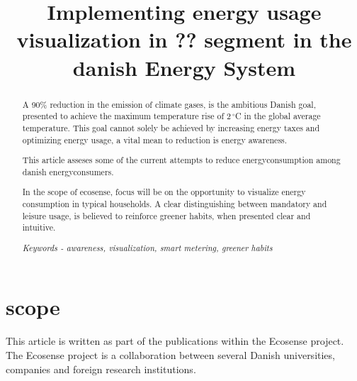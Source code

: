 \documentclass[journal]{IEEEtran}
\begin{document}
%
\title{Implementing energy usage visualization in ?? segment in the danish Energy System}


\author{
}









\maketitle


\begin{abstract}
A 90\% reduction in the emission of climate gases, is the ambitious Danish goal, presented to achieve the maximum temperature rise of 2$\,^{\circ}$C  in the global average temperature. This goal cannot solely be achieved by increasing energy taxes and optimizing energy usage, a vital mean to reduction is energy awareness. 

This article asseses some of the current attempts to reduce energyconsumption among danish energyconsumers.

In the scope of ecosense, focus will be on the opportunity to visualize energy consumption in typical households. A clear distinguishing between mandatory and leisure usage, is believed to reinforce greener habits, when presented clear and intuitive.

\textit{Keywords - awareness, visualization, smart metering, greener habits}
\end{abstract}

\section{scope}
This article is written as part of the publications within the Ecosense project. The Ecosense project is a collaboration between several Danish universities, companies and foreign research institutions. 
\end{document}
